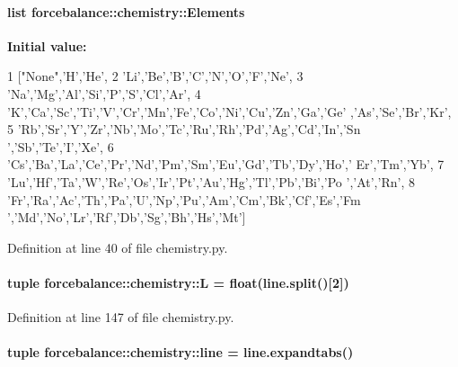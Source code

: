 \hypertarget{namespaceforcebalance_1_1chemistry_a12ef5f22f5cc3798107d3585c77a1c84}{
\paragraph[{\-Elements}]{\setlength{\rightskip}{0pt plus 5cm}list {\bf forcebalance\-::chemistry\-::\-Elements}}}\label{namespaceforcebalance_1_1chemistry_a12ef5f22f5cc3798107d3585c77a1c84}
{\bfseries \-Initial value\-:}
\begin{DoxyCode}
1 ["None",'H','He',
2             'Li','Be','B','C','N','O','F','Ne',
3             'Na','Mg','Al','Si','P','S','Cl','Ar',
4             'K','Ca','Sc','Ti','V','Cr','Mn','Fe','Co','Ni','Cu','Zn','Ga','Ge'
      ,'As','Se','Br','Kr',
5             'Rb','Sr','Y','Zr','Nb','Mo','Tc','Ru','Rh','Pd','Ag','Cd','In','Sn
      ','Sb','Te','I','Xe',
6             'Cs','Ba','La','Ce','Pr','Nd','Pm','Sm','Eu','Gd','Tb','Dy','Ho','
      Er','Tm','Yb',
7             'Lu','Hf','Ta','W','Re','Os','Ir','Pt','Au','Hg','Tl','Pb','Bi','Po
      ','At','Rn',
8             'Fr','Ra','Ac','Th','Pa','U','Np','Pu','Am','Cm','Bk','Cf','Es','Fm
      ','Md','No','Lr','Rf','Db','Sg','Bh','Hs','Mt']
\end{DoxyCode}


\-Definition at line 40 of file chemistry.\-py.

\hypertarget{namespaceforcebalance_1_1chemistry_ace6400fcf0f12a9d9f70aa7496984379}{
\paragraph[{\-L}]{\setlength{\rightskip}{0pt plus 5cm}tuple {\bf forcebalance\-::chemistry\-::\-L} = float(line.\-split()\mbox{[}2\mbox{]})}}\label{namespaceforcebalance_1_1chemistry_ace6400fcf0f12a9d9f70aa7496984379}


\-Definition at line 147 of file chemistry.\-py.

\hypertarget{namespaceforcebalance_1_1chemistry_a43d08c70d93e430fc6fd6689f622b61b}{
\paragraph[{line}]{\setlength{\rightskip}{0pt plus 5cm}tuple {\bf forcebalance\-::chemistry\-::line} = line.\-expandtabs()}}\label{namespaceforcebalance_1_1chemistry_a43d08c70d93e430fc6fd6689f622b61b}


